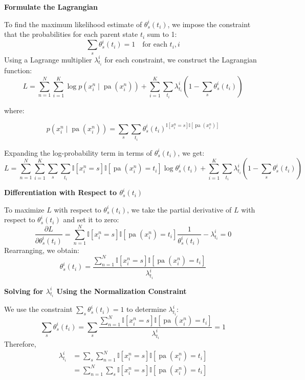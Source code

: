 \documentclass{article}
\begin{document}
\textbf{Formulate the Lagrangian}

To find the maximum likelihood estimate of \( \theta_s^i(t_i) \), we impose the constraint that the probabilities for each parent state \( t_i \) sum to 1:
\[
\sum_s \theta_s^i(t_i) = 1 \quad \text{for each } t_i , i 
\]
Using a Lagrange multiplier \( \lambda_{t_i}^i \) for each constraint, we construct the Lagrangian function:
\[
L = \sum_{n=1}^N \sum_{i=1}^K \log p\left(x_i^n \mid \operatorname{pa}(x_i^n)\right) + \sum_{i=1}^K \sum_{t_i} \lambda_{t_i}^i \left(1 - \sum_s \theta_s^i(t_i)\right)
\]

where:

\[
p\left(x_i^n \mid \operatorname{pa}(x_i^n)\right) = \sum_s \sum_{t_i}  \theta_s^i(t_i) ^{ \mathbb{I}\left[x_i^n = s\right] \mathbb{I}\left[\operatorname{pa}(x_i^n)\right] }
\]

Expanding the log-probability term in terms of \( \theta_s^i(t_i) \), we get:
\[
L = \sum_{n=1}^N \sum_{i=1}^K \sum_s \sum_{t_i}  \mathbb{I}\left[x_i^n = s\right] \mathbb{I}\left[\operatorname{pa}(x_i^n) = t_i\right] \log \theta_s^i(t_i) 
+ \sum_{i=1}^K \sum_{t_i} \lambda_{t_i}^i \left(1 - \sum_s \theta_s^i(t_i)\right)
\]

\textbf{Differentiation with Respect to \( \theta_s^i(t_i) \)}

To maximize \( L \) with respect to \( \theta_s^i(t_i) \), we take the partial derivative of \( L \) with respect to \( \theta_s^i(t_i) \) and set it to zero:
\[
\frac{\partial L}{\partial \theta_s^i(t_i)} = \sum_{n=1}^N \mathbb{I}\left[x_i^n = s\right] \mathbb{I}\left[\operatorname{pa}(x_i^n) = t_i\right] \frac{1}{\theta_s^i(t_i)} - \lambda_{t_i}^i = 0
\]
Rearranging, we obtain:
\[
\theta_s^i(t_i) = \frac{\sum_{n=1}^N \mathbb{I}\left[x_i^n = s\right] \mathbb{I}\left[\operatorname{pa}(x_i^n) = t_i\right]}{\lambda_{t_i}^i}
\]

\textbf{Solving for \( \lambda_{t_i}^i \) Using the Normalization Constraint}

We use the constraint \( \sum_s \theta_s^i(t_i) = 1 \) to determine \( \lambda_{t_i}^i \):
\[
\sum_s \theta_s^i(t_i) = \sum_s \frac{\sum_{n=1}^N \mathbb{I}\left[x_i^n = s\right] \mathbb{I}\left[\operatorname{pa}(x_i^n) = t_i\right]}{\lambda_{t_i}^i} = 1
\]
Therefore,
\[
\begin{aligned}    
\lambda_{t_i}^i 
&= \sum_s \sum_{n=1}^N \mathbb{I}\left[x_i^n = s\right] \mathbb{I}\left[\operatorname{pa}(x_i^n) = t_i\right]   \\
&= \sum_{n=1}^N  \sum_s \mathbb{I}\left[x_i^n = s\right] \mathbb{I}\left[\operatorname{pa}(x_i^n) = t_i\right]
\end{aligned}
\]
\end{document}
